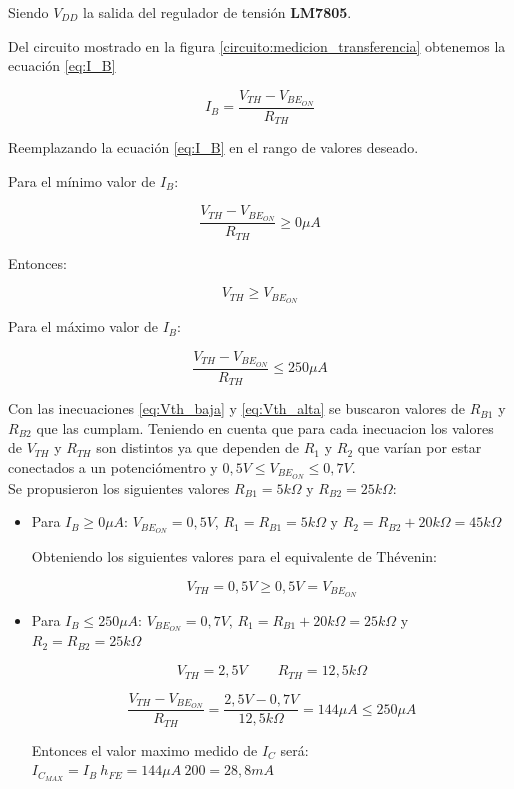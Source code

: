 \documentclass[10pt,spanish,a4paper,openany,notitlepage]{article}
\begin{document}
Siendo $V_{DD}$ la salida del regulador de tensión \textbf{LM7805}. 

Del circuito mostrado en la figura \ref{circuito:medicion_transferencia} obtenemos la ecuación \ref{eq:I_B}

\begin{equation}
\displaystyle I_B = \frac{V_{TH} - V_{BE_{ON}}}{R_{TH}}
\label{eq:I_B}
\end{equation}

Reemplazando la ecuación \ref{eq:I_B} en el rango de valores deseado.

Para el mínimo valor de $I_B$:

\[ \displaystyle \frac{V_{TH} - V_{BE_{ON}}}{R_{TH}} \geq 0 \unit{\mu A} \]

Entonces:

\begin{equation}
V_{TH} \geq V_{BE_{ON}}
\label{eq:Vth_baja}
\end{equation}

Para el máximo valor de $I_B$:

\begin{equation}
\frac{V_{TH} - V_{BE_{ON}}}{R_{TH}} \leq 250 \unit{\mu A}
\label{eq:Vth_alta}
\end{equation}

Con las inecuaciones \ref{eq:Vth_baja} y \ref{eq:Vth_alta} se buscaron valores de $R_{B1}$ y $R_{B2}$ que las cumplam. Teniendo en cuenta que para cada inecuacion los valores de $V_{TH}$ y $R_{TH}$ son distintos ya que dependen de $R_1$ y $R_2$ que varían por estar conectados a un potenciómentro y $0,5 \unit{V} \leq V_{BE_{ON}} \leq 0,7 \unit{V}$.\\

Se propusieron los siguientes valores $R_{B1} = 5\unit{k\Omega}$ y $R_{B2} = 25\unit{k\Omega}$:

\begin{itemize}
\item{Para $I_B \geq 0 \unit{\mu A}$}: $V_{BE_{ON}} = 0,5 \unit{V}$, $R_1 = R_{B1} = 5 \unit{k\Omega}$ y $R_2 = R_{B2} + 20\unit{k\Omega} = 45 \unit{k\Omega}$

Obteniendo los siguientes valores para el equivalente de Thévenin:

\[ \displaystyle V_{TH} =  0,5 \unit{V} \geq 0,5 \unit{V} = V_{BE_{ON}}\]

\item{Para $I_B \leq 250 \unit{\mu A}$}: $V_{BE_{ON}} = 0,7 \unit{V}$, $R_1 = R_{B1}+ 20\unit{k\Omega} = 25 \unit{k\Omega}$ y $R_2 = R_{B2} = 25 \unit{k\Omega}$

\[ \displaystyle V_{TH} =  2,5 \unit{V} \ \ \ \ \ \ \ \ \ \  R_{TH} = 12,5 \unit{k\Omega}\]

\[ \displaystyle \frac{V_{TH} - V_{BE_{ON}}}{R_{TH}} = \frac{2,5 \unit{V} - 0,7 \unit{V}}{12,5 \unit{k\Omega}} = 144 \unit{\mu A} \leq 250 \unit{\mu A} \]

Entonces el valor maximo medido de $I_C$ será: $I_{C_{MAX}} = I_B\ h_{FE} = 144 \unit{\mu A}\ 200 = 28,8 \unit{mA}$

\end{itemize}
\end{document}

